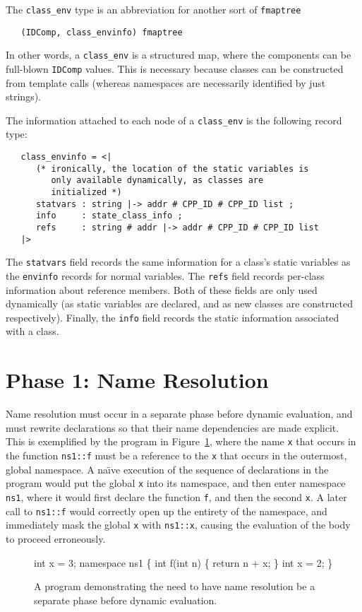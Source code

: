 \documentclass[11pt]{article}
\newcommand{\naive}{na\"\i{}ve}
\begin{document}
The \texttt{class_env} type is an abbreviation for another sort of
\texttt{fmaptree}
\begin{verbatim}
   (IDComp, class_envinfo) fmaptree
\end{verbatim}
In other words, a \texttt{class_env} is a structured map, where the
components can be full-blown \texttt{IDComp} values.  This is
necessary because classes can be constructed from template calls
(whereas namespaces are necessarily identified by just strings).

The information attached to each node of a \texttt{class_env} is the
following record type:
\begin{verbatim}
   class_envinfo = <|
      (* ironically, the location of the static variables is
         only available dynamically, as classes are
         initialized *)
      statvars : string |-> addr # CPP_ID # CPP_ID list ;
      info     : state_class_info ;
      refs     : string # addr |-> addr # CPP_ID # CPP_ID list
   |>
\end{verbatim}
The \texttt{statvars} field records the same information for a class's
static variables as the \texttt{envinfo} records for normal
variables.  The \texttt{refs} field records per-class information
about reference members.  Both of these fields are only used
dynamically (as static variables are declared, and as new classes are
constructed respectively).  Finally, the \texttt{info} field records
the static information associated with a class.



\section{Phase 1: Name Resolution}
\label{sec:phase1}

Name resolution must occur in a separate phase before dynamic
evaluation, and must rewrite declarations so that their name
dependencies are made explicit.  This is exemplified by the program in
Figure~\ref{fig:name-res-separate-phase}, where the name \texttt{x}
that occurs in the function \texttt{ns1::f} must be a reference to the
\texttt{x} that occurs in the outermost, global namespace.  A \naive{}
execution of the sequence of declarations in the program would put the
global \texttt{x} into its namespace, and then enter namespace
\texttt{ns1}, where it would first declare the function \texttt{f},
and then the second \texttt{x}.  A later call to \texttt{ns1::f} would
correctly open up the entirety of the namespace, and immediately mask
the global \texttt{x} with \texttt{ns1::x}, causing the evaluation of
the body to proceed erroneously.
\begin{figure}[htbp]
\begin{stdrule}
   int x = 3;
   namespace ns1 \{
     int f(int n) \{ return n + x; \}
     int x = 2;
   \}
\end{stdrule}
\caption[A Program Requiring Name Resolution]{A program
    demonstrating the need to have name resolution be a separate phase
    before dynamic evaluation.}
\label{fig:name-res-separate-phase}
\end{figure}
\end{document}
